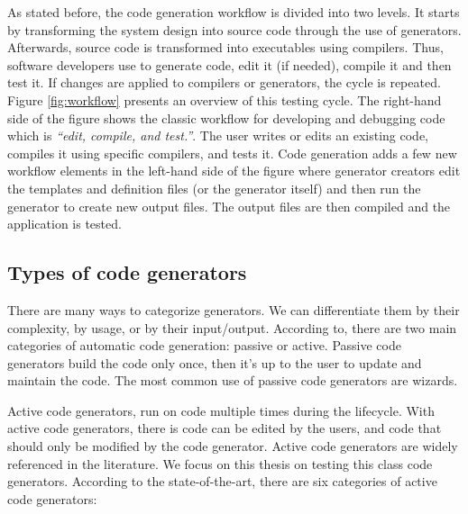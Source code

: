 As stated before, the code generation workflow is divided into two levels. It starts by transforming the system design into source code through the use of generators. Afterwards, source code is transformed into executables using compilers. Thus, software developers use to generate code, edit it (if needed), compile it and then test it. If changes are applied to compilers or generators, the cycle is repeated. Figure \ref{fig:workflow} presents an overview of this testing cycle. The right-hand side of the figure shows the classic workflow for developing and debugging code which is \textit{“edit, compile, and test.”}. The user writes or edits an existing code, compiles it using specific compilers, and tests it. Code generation adds a few new workflow elements in the left-hand side of the figure where generator creators edit the templates and definition files (or the generator itself) and then run the generator to create new output files. The output files are then compiled and the application is tested. 



\subsection{Types of code generators}
There are many ways to categorize generators. We can differentiate them by their complexity, by usage, or by their input/output. According to\cite{herrington2003code}, there are two main categories of automatic code generation: passive or active. Passive code generators build the code only once, then it’s up to the user to update and maintain the code. 
The most common use of passive code generators are wizards. 

Active code generators, run on code multiple times during the lifecycle. With active code generators, there is code can be edited by the users, and code that should only be modified by the code generator. Active code generators are widely referenced in the literature\cite{pais2005tool,amanquah2009rapid}. We focus on this thesis on testing this class code generators.
According to the state-of-the-art\cite{herrington2003code,hunt2000pragmatic,fertalj2008source,bajovs2013code}, there are six categories of active code generators: 

